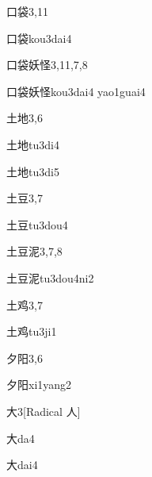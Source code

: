 \begin{entry}{口袋}{3,11}
  \begin{phonetics}{口袋}{kou3dai4}
  \end{phonetics}
\end{entry}

\begin{entry}{口袋妖怪}{3,11,7,8}
  \begin{phonetics}{口袋妖怪}{kou3dai4 yao1guai4}
  \end{phonetics}
\end{entry}

\begin{entry}{土地}{3,6}
  \begin{phonetics}{土地}{tu3di4}
  \end{phonetics}
  \begin{phonetics}{土地}{tu3di5}
  \end{phonetics}
\end{entry}

\begin{entry}{土豆}{3,7}
  \begin{phonetics}{土豆}{tu3dou4}
  \end{phonetics}
\end{entry}

\begin{entry}{土豆泥}{3,7,8}
  \begin{phonetics}{土豆泥}{tu3dou4ni2}
  \end{phonetics}
\end{entry}

\begin{entry}{土鸡}{3,7}
  \begin{phonetics}{土鸡}{tu3ji1}
  \end{phonetics}
\end{entry}

\begin{entry}{夕阳}{3,6}
  \begin{phonetics}{夕阳}{xi1yang2}
  \end{phonetics}
\end{entry}

\begin{entry}{大}{3}[Radical ⼈]
  \begin{phonetics}{大}{da4}
  \end{phonetics}
  \begin{phonetics}{大}{dai4}
  \end{phonetics}
\end{entry}

